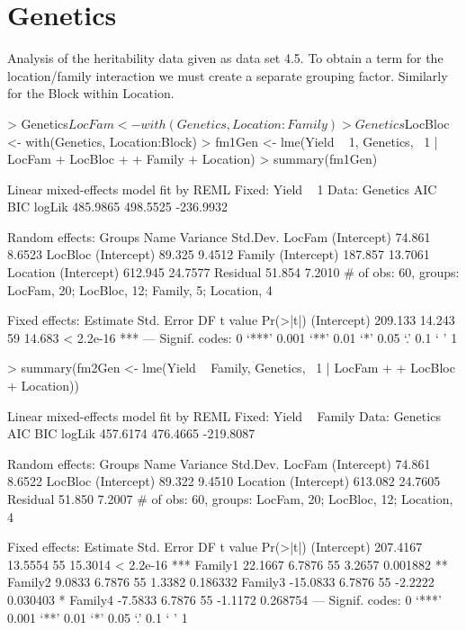 \documentclass[12pt]{article}
\begin{document}
\section{Genetics}
\label{sec:Genetics}

Analysis of the heritability data given as data set 4.5.  To obtain a
term for the location/family interaction we must create a separate
grouping factor.  Similarly for the Block within Location.
\begin{Schunk}
\begin{Sinput}
> Genetics$LocFam <- with(Genetics, Location:Family)
> Genetics$LocBloc <- with(Genetics, Location:Block)
> fm1Gen <- lme(Yield ~ 1, Genetics, ~1 | LocFam + LocBloc + 
+     Family + Location)
> summary(fm1Gen)
\end{Sinput}
\begin{Soutput}
Linear mixed-effects model fit by REML
Fixed: Yield ~ 1 
 Data: Genetics 
      AIC      BIC    logLik
 485.9865 498.5525 -236.9932

Random effects:
 Groups   Name        Variance Std.Dev.
 LocFam   (Intercept)  74.861   8.6523 
 LocBloc  (Intercept)  89.325   9.4512 
 Family   (Intercept) 187.857  13.7061 
 Location (Intercept) 612.945  24.7577 
 Residual              51.854   7.2010 
# of obs: 60, groups: LocFam, 20; LocBloc, 12; Family, 5; Location, 4

Fixed effects:
            Estimate Std. Error DF t value  Pr(>|t|)    
(Intercept)  209.133     14.243 59  14.683 < 2.2e-16 ***
---
Signif. codes:  0 `***' 0.001 `**' 0.01 `*' 0.05 `.' 0.1 ` ' 1 
\end{Soutput}
\begin{Sinput}
> summary(fm2Gen <- lme(Yield ~ Family, Genetics, ~1 | LocFam + 
+     LocBloc + Location))
\end{Sinput}
\begin{Soutput}
Linear mixed-effects model fit by REML
Fixed: Yield ~ Family 
 Data: Genetics 
      AIC      BIC    logLik
 457.6174 476.4665 -219.8087

Random effects:
 Groups   Name        Variance Std.Dev.
 LocFam   (Intercept)  74.861   8.6522 
 LocBloc  (Intercept)  89.322   9.4510 
 Location (Intercept) 613.082  24.7605 
 Residual              51.850   7.2007 
# of obs: 60, groups: LocFam, 20; LocBloc, 12; Location, 4

Fixed effects:
            Estimate Std. Error DF t value  Pr(>|t|)    
(Intercept) 207.4167    13.5554 55 15.3014 < 2.2e-16 ***
Family1      22.1667     6.7876 55  3.2657  0.001882 ** 
Family2       9.0833     6.7876 55  1.3382  0.186332    
Family3     -15.0833     6.7876 55 -2.2222  0.030403 *  
Family4      -7.5833     6.7876 55 -1.1172  0.268754    
---
Signif. codes:  0 `***' 0.001 `**' 0.01 `*' 0.05 `.' 0.1 ` ' 1 


\end{Soutput}
\end{Schunk}
\end{document}

